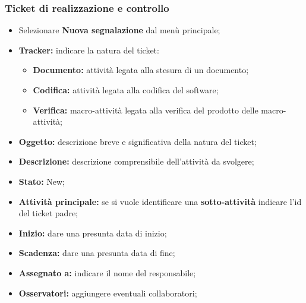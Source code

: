       \subsubsection{Ticket di realizzazione e controllo}
        \begin{itemize}
          \item Selezionare \textbf{Nuova segnalazione} dal menù principale;
          \item \textbf{Tracker: }indicare la natura del ticket:
          \bgroup
            \begin{itemize}
              \item \textbf{Documento: }attività legata alla stesura di un documento;
              \item \textbf{Codifica: }attività legata alla  codifica del software;
              \item \textbf{Verifica: }macro-attività legata alla verifica del prodotto delle macro-attività;
            \end{itemize}
          \egroup
            \item \textbf{Oggetto: }descrizione breve e significativa della natura del ticket;
          \item \textbf{Descrizione: }descrizione comprensibile dell'attività da svolgere;
          \item \textbf{Stato: }New;
          \item \textbf{Attività principale: }se si vuole identificare una \textbf{sotto-attività} indicare l'id del ticket padre;
          \item \textbf{Inizio: }dare una presunta data di inizio;
          \item \textbf{Scadenza: }dare una presunta data di fine;
          \item \textbf{Assegnato a: }indicare il nome del responsabile;
          \item \textbf{Osservatori: }aggiungere eventuali collaboratori;
        \end{itemize}
